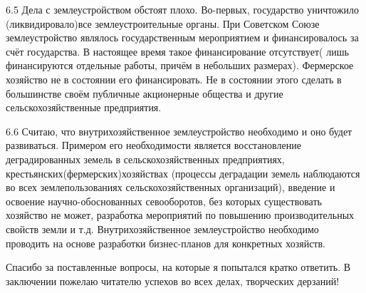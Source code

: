 6.5 Дела с землеустройством обстоят плохо. Во-первых, государство уничтожило (ликвидировало)все землеустроительные органы. При Советском Союзе землеустройство являлось государственным мероприятием и финансировалось за счёт государства. В настоящее время такое финансирование отсутствует( лишь финансируются отдельные работы, причём в небольших размерах). Фермерское хозяйство не в состоянии его финансировать. Не в состоянии этого сделать в большинстве своём публичные акционерные общества и другие сельскохозяйственные предприятия.

6.6 Считаю, что внутрихозяйственное землеустройство необходимо и оно будет развиваться. Примером его необходимости является восстановление деградированных земель в сельскохозяйственных предприятиях, крестьянских(фермерских)хозяйствах (процессы деградации земель наблюдаются во всех землепользованиях сельскохозяйственных организаций), введение и освоение научно-обоснованных севооборотов, без которых существовать хозяйство не может, разработка мероприятий по повышению производительных свойств земли и т.д. Внутрихозяйственное землеустройство необходимо проводить на основе разработки бизнес-планов для конкретных хозяйств.

Спасибо за поставленные вопросы, на которые я попытался кратко ответить. В заключении пожелаю читателю успехов во всех делах, творческих дерзаний!